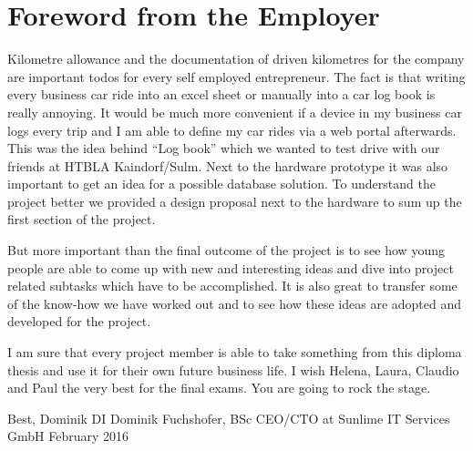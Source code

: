 \chapter*{Foreword from the Employer}
Kilometre allowance and the documentation of driven kilometres for the company are important todos for every self employed entrepreneur. The fact is that writing every business car ride into an excel sheet or manually into a car log book is really annoying. It would be much more convenient if a device in my business car logs every trip and I am able to define my car rides via a web portal afterwards. This was the idea behind “Log book” which we wanted to test drive with our friends at HTBLA Kaindorf/Sulm. Next to the hardware prototype it was also important to get an idea for a possible database solution. To understand the project better we provided a design proposal next to the hardware to sum up the first section of the project.

But more important than the final outcome of the project is to see how young people are able to come up with new and interesting ideas and dive into project related subtasks which have to be accomplished. It is also great to transfer some of the know-how we have worked out and to see how these ideas are adopted and developed for the project.

I am sure that every project member is able to take something from this diploma thesis and use it for their own future business life. I wish Helena, Laura, Claudio and Paul the very best for the final exams. You are going to rock the stage.

  Best,\newline
Dominik\newline\newline
DI Dominik Fuchshofer, BSc\newline
CEO/CTO at Sunlime IT Services GmbH\newline
February 2016
